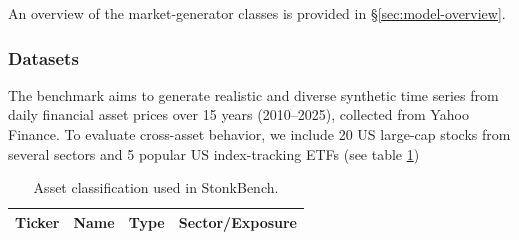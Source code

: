       An overview of the market-generator classes is provided in
      §\ref{sec:model-overview}.

    \subsubsection{Datasets}
      The benchmark aims to generate realistic and diverse synthetic
      time series from daily financial asset prices over 15 years
      (2010--2025), collected from Yahoo Finance. To evaluate
      cross-asset behavior, we include 20 US large-cap stocks from
      several sectors and 5 popular US index-tracking ETFs (see table
      \ref{tab:asset-classification})

        \begin{table}[t]
        \centering
        \caption{Asset classification used in StonkBench.}
        \label{tab:asset-classification}
        \begin{tabular}{l l l l}
        \hline
        Ticker & Name & Type & Sector/Exposure \\
        \hline


\end{tabular}
\end{table}
